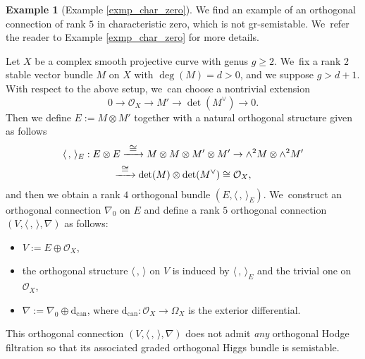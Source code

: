 \documentclass[JEP,XML,SOM,Unicode,published]{cedram}
\newcommand\To[1]{\mathchoice{\xrightarrow{\textstyle\kern4pt#1\kern3pt}}{\stackrel{#1}{\to}}{}{}}
\newcommand{\grsemistable}{gr\nobreakdash-semi\-stable\xspace}
\theoremstyle{plain}
\theoremstyle{definition}
\newtheorem{examp}[thm]{Example}
\begin{document}
\begin{examp}[Example \ref{exmp_char_zero}]
We find an example of an orthogonal connection of rank $5$ in characteristic zero, which is not \grsemistable. We~refer the reader to Example \ref{exmp_char_zero} for more details.

Let $X$ be a complex smooth projective curve with genus $g \geq 2$. We~fix a rank $2$ stable vector bundle $M$ on $X$ with $\deg(M)=d>0$, and we suppose $g > d+1$. With respect to the above setup, we~can choose a nontrivial extension
\[
0 \to \mathcal{O}_X \to M' \to \det(M^{\vee}) \to 0.
\]
Then we define $E := M \otimes M'$ together with a natural orthogonal structure given as follows
\begin{multline*}
\langle \,, \, \rangle_E : E \otimes E \To{\cong} M \otimes M \otimes M' \otimes M' \to \wedge^2 M \otimes \wedge^2 M' \\
\To{\cong} \det(M) \otimes \det(M^{\vee}) \cong \mathcal{O}_X,
\end{multline*}
and then we obtain a rank $4$ orthogonal bundle $(E, \langle \,, \, \rangle_E)$. We~construct an orthogonal connection $\nabla_0$ on $E$ and define a rank $5$ orthogonal connection $(V, \langle \,, \, \rangle, \nabla)$ as follows:
\begin{itemize}
\item $V:= E \oplus \mathcal{O}_X$,
\item the orthogonal structure $\langle \,, \, \rangle$ on $V$ is induced by $\langle \,, \, \rangle_E$ and the trivial one on $\mathcal{O}_X$,
\item $\nabla:=\nabla_0 \oplus \mathrm{d}_\mathrm{can}$, where $\mathrm{d}_\mathrm{can}: \mathcal{O}_X \to \Omega_X$ is the exterior differential.
\end{itemize}
This orthogonal connection $(V, \langle \,, \, \rangle, \nabla)$ does not admit \emph{any} orthogonal Hodge filtration so that its associated graded orthogonal Higgs bundle is semistable.
\end{examp}
\end{document}
